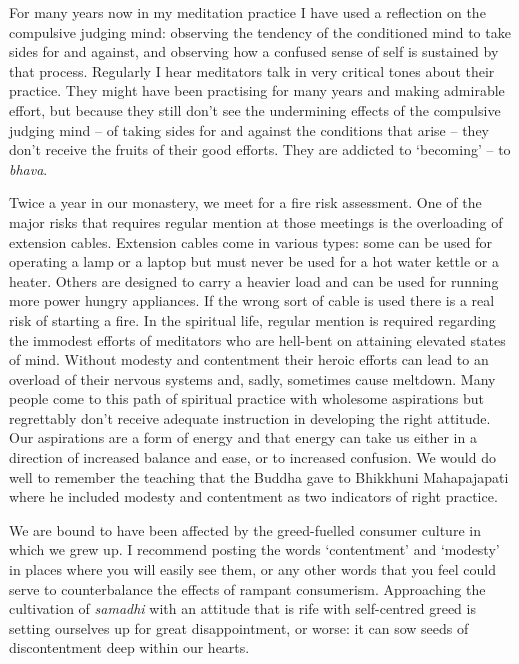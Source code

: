 For many years now in my meditation practice I have used a reflection on
the compulsive judging mind: observing the tendency of the conditioned
mind to take sides for and against, and observing how a confused sense
of self is sustained by that process. Regularly I hear meditators talk
in very critical tones about their practice. They might have been
practising for many years and making admirable effort, but because they
still don't see the undermining effects of the compulsive judging mind
-- of taking sides for and against the conditions that arise -- they
don't receive the fruits of their good efforts. They are addicted to
`becoming' -- to \emph{bhava}.

Twice a year in our monastery, we meet for a fire risk assessment. One
of the major risks that requires regular mention at those meetings is
the overloading of extension cables. Extension cables come in various
types: some can be used for operating a lamp or a laptop but must never
be used for a hot water kettle or a heater. Others are designed to carry
a heavier load and can be used for running more power hungry appliances.
If the wrong sort of cable is used there is a real risk of
starting a fire. In the spiritual life, regular mention is required
regarding the immodest efforts of meditators who are hell-bent on
attaining elevated states of mind. Without modesty and contentment their
heroic efforts can lead to an overload of their nervous systems and,
sadly, sometimes cause meltdown. Many people come to this path of
spiritual practice with wholesome aspirations but regrettably don't
receive adequate instruction in developing the right attitude. Our
aspirations are a form of energy and that energy can take us either in a
direction of increased balance and ease, or to increased confusion. We
would do well to remember the teaching that the Buddha gave to Bhikkhuni
Mahapajapati where he included modesty and contentment as two indicators
of right practice.

We are bound to have been affected by the greed-fuelled consumer culture
in which we grew up. I recommend posting the words `contentment' and
`modesty' in places where you will easily see them, or any other words
that you feel could serve to counterbalance the effects of rampant
consumerism. Approaching the cultivation of \emph{samadhi} with an
attitude that is rife with self-centred greed is setting ourselves up
for great disappointment, or worse: it can sow seeds of discontentment
deep within our hearts.

